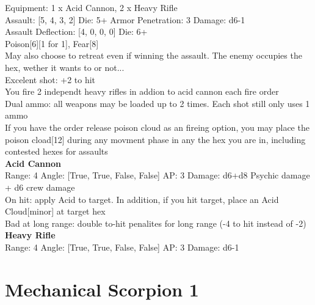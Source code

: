Equipment: 1 x Acid Cannon, 2 x Heavy Rifle \\

Assault: [5, 4, 3, 2] Die: 5+ Armor Penetration: 3 Damage: d6-1 \\
Assault Deflection: [4, 0, 0, 0] Die: 6+\\
\indent Poison[6][1 for 1], Fear[8]\\ 
May also choose to retreat even if winning the assault. The enemy occupies the hex, wether it wants to or not...\\ 
 

Excelent shot: +2 to hit\\ 
You fire 2 independt heavy rifles in addion to acid cannon each fire order\\ 
Dual ammo: all weapons may be loaded up to 2 times. Each shot still only uses 1 ammo\\ 
If you have the order release poison cloud as an fireing option, you may place the poison cload[12] during any movment phase in any the hex you are in, including contested hexes for assaults\\ 


{\bf Acid Cannon } \\



Range: 4  Angle: [True, True, False, False] AP: 3 Damage: d6+d8 Psychic damage + d6 crew damage \\
On hit: apply Acid to target. In addition, if you hit target, place an Acid Cloud[minor] at target hex\\ 
Bad at long range: double to-hit penalites for long range (-4 to hit instead of -2)\\ 




{\bf Heavy Rifle } \\



Range: 4  Angle: [True, True, False, False] AP: 3 Damage: d6-1 \\




 















\clearpage

\section{ Mechanical Scorpion 1 }

